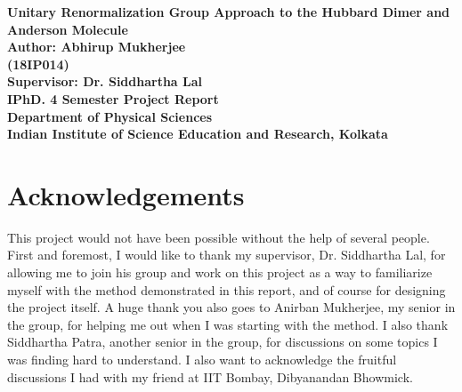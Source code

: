 \documentclass[12pt]{article}
\begin{document}
\begin{titlepage}
\begin{center}
	\vspace{10pt}
\bf{\Huge{Unitary Renormalization Group Approach to the Hubbard Dimer and Anderson Molecule}}\\
	\vspace{50pt}
	\Large{Author: \bf{Abhirup Mukherjee}}\\
	\bf{\Large{{(18IP014)}}}\\
	\vspace{20pt}
	\Large{Supervisor: \bf{Dr. Siddhartha Lal}}\\
	\vspace{50pt}
	\bf{\Large{IPhD. 4 Semester Project Report}}\\
	\vspace{20pt}
	\bf{\Large{Department of Physical Sciences}}\\
	\vspace{20pt}
	\bf{\Large{Indian Institute of Science Education and Research, Kolkata}}\\

\end{center}

\end{titlepage}

\section*{Acknowledgements}
This project would not have been possible without the help of several people. First and foremost, I would like to thank my supervisor, Dr. Siddhartha Lal, for allowing me to join his group and work on this project as a way to familiarize myself with the method demonstrated in this report, and of course for designing the project itself. A huge thank you also goes to Anirban Mukherjee, my senior in the group, for helping me out when I was starting with the method. I also thank Siddhartha Patra, another senior in the group, for discussions on some topics I was finding hard to understand. I also want to acknowledge the fruitful discussions I had with my friend at IIT Bombay, Dibyanandan Bhowmick.
\newpage
\end{document}
